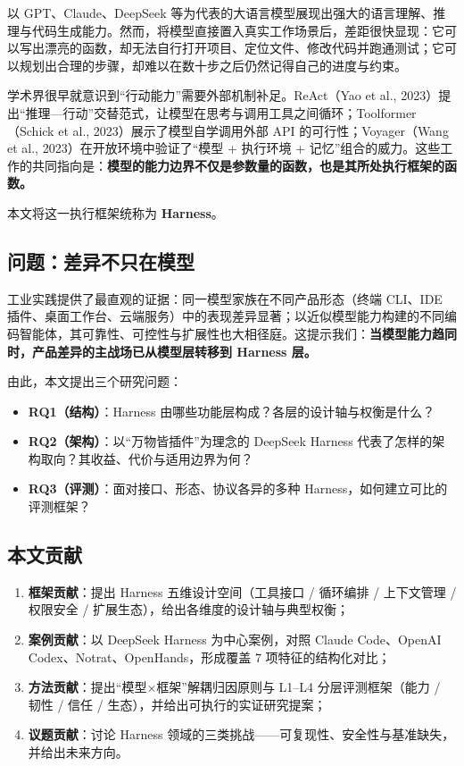 \documentclass[11pt,a4paper]{ctexart}
\begin{document}
以 GPT、Claude、DeepSeek 等为代表的大语言模型展现出强大的语言理解、推理与代码生成能力。然而，将模型直接置入真实工作场景后，差距很快显现：它可以写出漂亮的函数，却无法自行打开项目、定位文件、修改代码并跑通测试；它可以规划出合理的步骤，却难以在数十步之后仍然记得自己的进度与约束。

学术界很早就意识到“行动能力”需要外部机制补足。ReAct（Yao et al., 2023）提出“推理—行动”交替范式，让模型在思考与调用工具之间循环；Toolformer（Schick et al., 2023）展示了模型自学调用外部 API 的可行性；Voyager（Wang et al., 2023）在开放环境中验证了“模型 + 执行环境 + 记忆”组合的威力。这些工作的共同指向是：\textbf{模型的能力边界不仅是参数量的函数，也是其所处执行框架的函数。}

本文将这一执行框架统称为 \textbf{Harness}。

\subsection{问题：差异不只在模型}

工业实践提供了最直观的证据：同一模型家族在不同产品形态（终端 CLI、IDE 插件、桌面工作台、云端服务）中的表现差异显著；以近似模型能力构建的不同编码智能体，其可靠性、可控性与扩展性也大相径庭。这提示我们：\textbf{当模型能力趋同时，产品差异的主战场已从模型层转移到 Harness 层。}

由此，本文提出三个研究问题：

\begin{itemize}
  \item \textbf{RQ1（结构）}：Harness 由哪些功能层构成？各层的设计轴与权衡是什么？
  \item \textbf{RQ2（架构）}：以“万物皆插件”为理念的 DeepSeek Harness 代表了怎样的架构取向？其收益、代价与适用边界为何？
  \item \textbf{RQ3（评测）}：面对接口、形态、协议各异的多种 Harness，如何建立可比的评测框架？
\end{itemize}

\subsection{本文贡献}

\begin{enumerate}
  \item \textbf{框架贡献}：提出 Harness 五维设计空间（工具接口 / 循环编排 / 上下文管理 / 权限安全 / 扩展生态），给出各维度的设计轴与典型权衡；
  \item \textbf{案例贡献}：以 DeepSeek Harness 为中心案例，对照 Claude Code、OpenAI Codex、Notrat、OpenHands，形成覆盖 7 项特征的结构化对比；
  \item \textbf{方法贡献}：提出“模型×框架”解耦归因原则与 L1--L4 分层评测框架（能力 / 韧性 / 信任 / 生态），并给出可执行的实证研究提案；
  \item \textbf{议题贡献}：讨论 Harness 领域的三类挑战——可复现性、安全性与基准缺失，并给出未来方向。
\end{enumerate}
\end{document}
